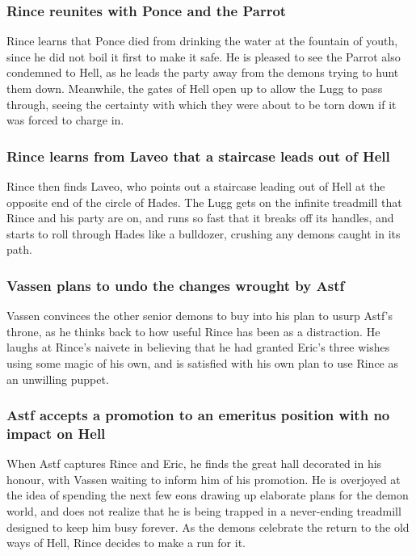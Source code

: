 \subsubsection{\Gls{Rince} reunites with \Gls{Ponce} and the \Gls{Parrot}}
\Gls{Rince} learns that \Gls{Ponce} died from drinking the water at the fountain of youth, since he
did not boil it first to make it safe. He is pleased to see the \Gls{Parrot} also condemned to Hell,
as he leads the party away from the demons trying to hunt them down. Meanwhile, the gates of Hell
open up to allow the \Gls{Lugg} to pass through, seeing the certainty with which they were about to
be torn down if it was forced to charge in.

\subsubsection{\Gls{Rince} learns from \Gls{Laveo} that a staircase leads out of Hell}
\Gls{Rince} then finds \Gls{Laveo}, who points out a staircase leading out of Hell at the opposite
end of the circle of Hades. The \Gls{Lugg} gets on the infinite treadmill that \Gls{Rince} and his
party are on, and runs so fast that it breaks off its handles, and starts to roll through Hades
like a bulldozer, crushing any demons caught in its path.

\subsubsection{\Gls{Vassen} plans to undo the changes wrought by \Gls{Astf}}
\Gls{Vassen} convinces the other senior demons to buy into his plan to usurp \Gls{Astf}'s throne,
as he thinks back to how useful \Gls{Rince} has been as a distraction. He laughs at \Gls{Rince}'s
naivete in believing that he had granted \Gls{Eric}'s three wishes using some magic of his own, and
is satisfied with his own plan to use \Gls{Rince} as an unwilling puppet.

\subsubsection{\Gls{Astf} accepts a promotion to an emeritus position with no impact on Hell}
When \Gls{Astf} captures \Gls{Rince} and \Gls{Eric}, he finds the great hall decorated in his
honour, with \Gls{Vassen} waiting to inform him of his promotion. He is overjoyed at the idea of
spending the next few eons drawing up elaborate plans for the demon world, and does not realize that
he is being trapped in a never-ending treadmill designed to keep him busy forever. As the demons
celebrate the return to the old ways of Hell, \Gls{Rince} decides to make a run for it.

